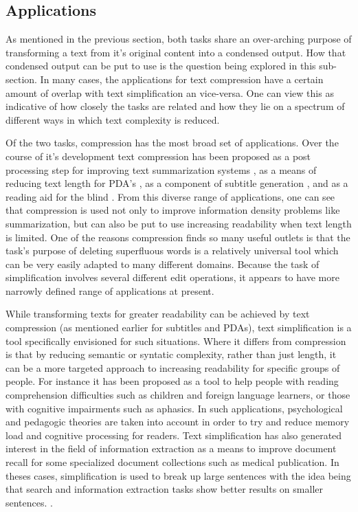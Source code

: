 {\subsection{Applications}


{As mentioned in the previous section, both tasks share an over-arching purpose of transforming a text from it's original content into a condensed output. How that condensed output can be put to use is the question being explored in this sub-section.  In many cases, the applications for text compression have a certain amount of overlap with text simplification an vice-versa. One can view this as indicative of how closely the tasks are related and how they  lie on a spectrum of different ways in which text complexity is reduced.}

{Of the two tasks, compression has the most broad set of applications.  Over the course of it's development text compression has been proposed as a post processing step for improving text summarization systems \citep{Jing:2000:SRA:974147.974190,Knight:2002:SBS:604203.604207} , as a means of reducing text length for PDA's \citep{corston2001text}, as a component of subtitle generation \citep{vandeghinste2004sentence}, and as a reading aid for the blind \citep{grefenstette1998producing}. From this diverse range of applications, one can see that compression is used not only to improve information density problems like summarization, but can also be put to  use increasing readability when text length is limited. One of the reasons compression finds so many useful outlets is that the task's purpose of deleting superfluous words is a relatively universal tool which can be very easily adapted to many different domains.  Because the task of simplification involves several different edit operations, it appears to have more narrowly defined range of applications at present.}


{While transforming texts for greater readability can be achieved by text compression (as mentioned earlier for subtitles and PDAs), text simplification is a tool specifically envisioned for such situations.  Where it differs from compression is that by reducing semantic or syntatic complexity, rather than just length, it can be a more targeted approach to increasing readability for specific groups of people.  For instance it has been proposed as a tool to help people with reading comprehension difficulties such as children and foreign language learners, or those with cognitive impairments such as aphasics\citep{Feng2008}. In such applications, psychological and pedagogic theories are taken into account in order to try and reduce memory load and cognitive processing for readers.  Text simplification has also generated interest in the field of information extraction as a means to improve document recall for some specialized document collections such as medical publication. In theses cases, simplification is used to break up large sentences with the idea being that search and information extraction tasks show better results on smaller sentences.  \citep{jonnalagadda2010biosimplify}.}


}
